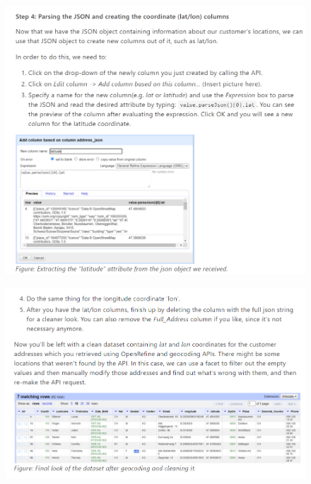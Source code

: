 \begin{figure}[H]
    \includegraphics[width=\linewidth]{./Figures/Appendices/worksheet/47.png}
\end{figure}
\begin{figure}[H]
    \includegraphics[width=\linewidth]{./Figures/Appendices/worksheet/48.png}
\end{figure}
